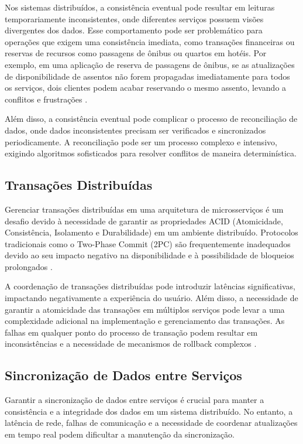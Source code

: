 Nos sistemas distribuídos, a consistência eventual pode resultar em leituras temporariamente inconsistentes, onde diferentes serviços possuem visões divergentes dos dados. Esse comportamento pode ser problemático para operações que exigem uma consistência imediata, como transações financeiras ou reservas de recursos como passagens de ônibus ou quartos em hotéis. Por exemplo, em uma aplicação de reserva de passagens de ônibus, se as atualizações de disponibilidade de assentos não forem propagadas imediatamente para todos os serviços, dois clientes podem acabar reservando o mesmo assento, levando a conflitos e frustrações \cite{vogels2009}.

Além disso, a consistência eventual pode complicar o processo de reconciliação de dados, onde dados inconsistentes precisam ser verificados e sincronizados periodicamente. A reconciliação pode ser um processo complexo e intensivo, exigindo algoritmos sofisticados para resolver conflitos de maneira determinística.

\subsection{Transações Distribuídas}

Gerenciar transações distribuídas em uma arquitetura de microsserviços é um desafio devido à necessidade de garantir as propriedades ACID (Atomicidade, Consistência, Isolamento e Durabilidade) em um ambiente distribuído. Protocolos tradicionais como o Two-Phase Commit (2PC) são frequentemente inadequados devido ao seu impacto negativo na disponibilidade e à possibilidade de bloqueios prolongados \cite{silberschatz2020}.

A coordenação de transações distribuídas pode introduzir latências significativas, impactando negativamente a experiência do usuário. Além disso, a necessidade de garantir a atomicidade das transações em múltiplos serviços pode levar a uma complexidade adicional na implementação e gerenciamento das transações. As falhas em qualquer ponto do processo de transação podem resultar em inconsistências e a necessidade de mecanismos de rollback complexos \cite{gray2006}.

\subsection{Sincronização de Dados entre Serviços}

Garantir a sincronização de dados entre serviços é crucial para manter a consistência e a integridade dos dados em um sistema distribuído. No entanto, a latência de rede, falhas de comunicação e a necessidade de coordenar atualizações em tempo real podem dificultar a manutenção da sincronização.

